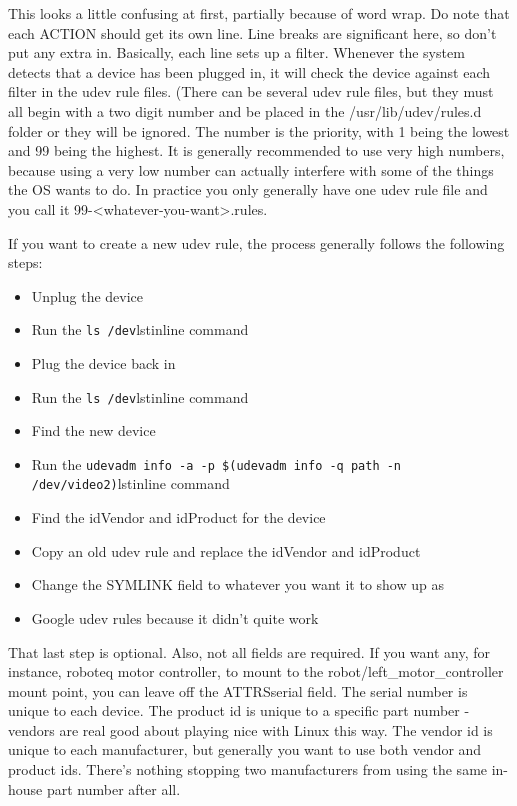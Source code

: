This looks a little confusing at first, partially because of word wrap. Do note that each ACTION should get its own line. Line breaks are significant here, so don't put any extra in. Basically, each line sets up a filter. Whenever the system detects that a device has been plugged in, it will check the device against each filter in the udev rule files. (There can be several udev rule files, but they must all begin with a two digit number and be placed in the /usr/lib/udev/rules.d folder or they will be ignored. The number is the priority, with 1 being the lowest and 99 being the highest. It is generally recommended to use very high numbers, because using a very low number can actually interfere with some of the things the OS wants to do. In practice you only generally have one udev rule file and you call it 99-<whatever-you-want>.rules.

If you want to create a new udev rule, the process generally follows the following steps:

\begin{itemize}
\item{Unplug the device}
\item{Run the \lstinline{ls /dev}lstinline{} command}
\item{Plug the device back in}
\item{Run the \lstinline{ls /dev}lstinline{} command}
\item{Find the new device}
\item{Run the \lstinline{udevadm info -a -p $(udevadm info -q path -n /dev/video2)}lstinline{} command}
\item{Find the idVendor and idProduct for the device}
\item{Copy an old udev rule and replace the idVendor and idProduct}
\item{Change the SYMLINK field to whatever you want it to show up as}
\item{Google udev rules because it didn't quite work}
\end{itemize}

That last step is optional. Also, not all fields are required. If you want any, for instance, roboteq motor controller, to mount to the robot/left\_motor\_controller mount point, you can leave off the ATTRS{serial} field. The serial number is unique to each device. The product id is unique to a specific part number - vendors are real good about playing nice with Linux this way. The vendor id is unique to each manufacturer, but generally you want to use both vendor and product ids. There's nothing stopping two manufacturers from using the same in-house part number after all.

